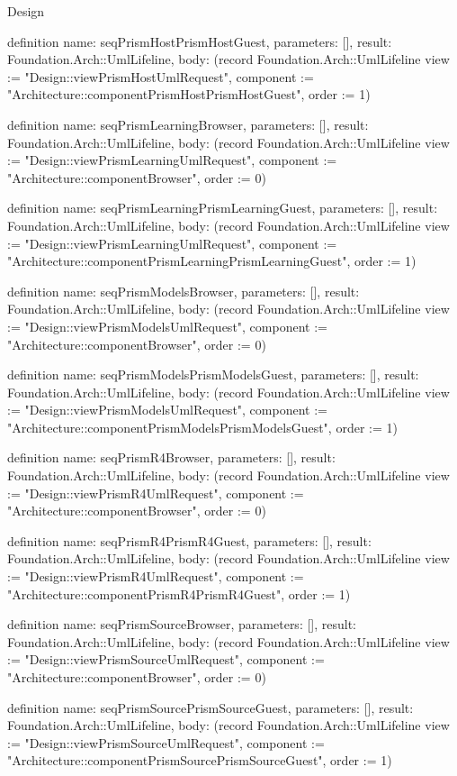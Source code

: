\begin{lexlean}{Design}
\begin{semanticmodule}
definition{
  name: seqPrismHostPrismHostGuest,
  parameters: [],
  result: Foundation.Arch::UmlLifeline,
  body: (record Foundation.Arch::UmlLifeline {view := "Design::viewPrismHostUmlRequest", component := "Architecture::componentPrismHostPrismHostGuest", order := 1})
}

definition{
  name: seqPrismLearningBrowser,
  parameters: [],
  result: Foundation.Arch::UmlLifeline,
  body: (record Foundation.Arch::UmlLifeline {view := "Design::viewPrismLearningUmlRequest", component := "Architecture::componentBrowser", order := 0})
}

definition{
  name: seqPrismLearningPrismLearningGuest,
  parameters: [],
  result: Foundation.Arch::UmlLifeline,
  body: (record Foundation.Arch::UmlLifeline {view := "Design::viewPrismLearningUmlRequest", component := "Architecture::componentPrismLearningPrismLearningGuest", order := 1})
}

definition{
  name: seqPrismModelsBrowser,
  parameters: [],
  result: Foundation.Arch::UmlLifeline,
  body: (record Foundation.Arch::UmlLifeline {view := "Design::viewPrismModelsUmlRequest", component := "Architecture::componentBrowser", order := 0})
}

definition{
  name: seqPrismModelsPrismModelsGuest,
  parameters: [],
  result: Foundation.Arch::UmlLifeline,
  body: (record Foundation.Arch::UmlLifeline {view := "Design::viewPrismModelsUmlRequest", component := "Architecture::componentPrismModelsPrismModelsGuest", order := 1})
}

definition{
  name: seqPrismR4Browser,
  parameters: [],
  result: Foundation.Arch::UmlLifeline,
  body: (record Foundation.Arch::UmlLifeline {view := "Design::viewPrismR4UmlRequest", component := "Architecture::componentBrowser", order := 0})
}

definition{
  name: seqPrismR4PrismR4Guest,
  parameters: [],
  result: Foundation.Arch::UmlLifeline,
  body: (record Foundation.Arch::UmlLifeline {view := "Design::viewPrismR4UmlRequest", component := "Architecture::componentPrismR4PrismR4Guest", order := 1})
}

definition{
  name: seqPrismSourceBrowser,
  parameters: [],
  result: Foundation.Arch::UmlLifeline,
  body: (record Foundation.Arch::UmlLifeline {view := "Design::viewPrismSourceUmlRequest", component := "Architecture::componentBrowser", order := 0})
}

definition{
  name: seqPrismSourcePrismSourceGuest,
  parameters: [],
  result: Foundation.Arch::UmlLifeline,
  body: (record Foundation.Arch::UmlLifeline {view := "Design::viewPrismSourceUmlRequest", component := "Architecture::componentPrismSourcePrismSourceGuest", order := 1})
}


\end{semanticmodule}
\end{lexlean}
